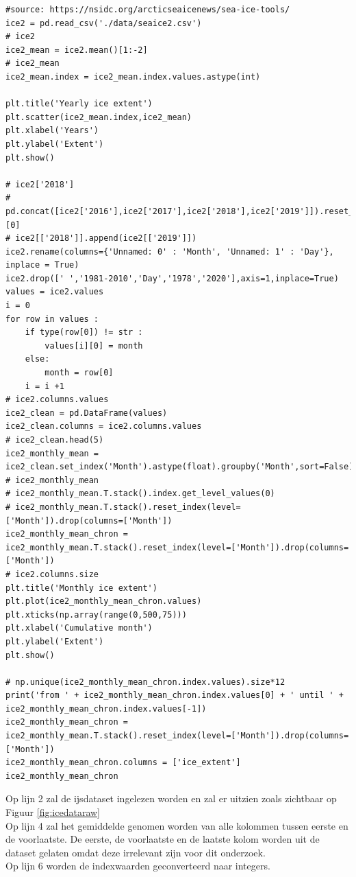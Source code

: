 \label{code:prep_ice}
\begin{verbatim}
#source: https://nsidc.org/arcticseaicenews/sea-ice-tools/
ice2 = pd.read_csv('./data/seaice2.csv')
# ice2
ice2_mean = ice2.mean()[1:-2]
# ice2_mean
ice2_mean.index = ice2_mean.index.values.astype(int)

plt.title('Yearly ice extent')
plt.scatter(ice2_mean.index,ice2_mean)
plt.xlabel('Years')
plt.ylabel('Extent')
plt.show()

# ice2['2018']
# pd.concat([ice2['2016'],ice2['2017'],ice2['2018'],ice2['2019']]).reset_index()[0]
# ice2[['2018']].append(ice2[['2019']])
ice2.rename(columns={'Unnamed: 0' : 'Month', 'Unnamed: 1' : 'Day'}, inplace = True)
ice2.drop([' ','1981-2010','Day','1978','2020'],axis=1,inplace=True)
values = ice2.values
i = 0
for row in values :
    if type(row[0]) != str :
        values[i][0] = month
    else:
        month = row[0]
    i = i +1
# ice2.columns.values
ice2_clean = pd.DataFrame(values)
ice2_clean.columns = ice2.columns.values
# ice2_clean.head(5)
ice2_monthly_mean = ice2_clean.set_index('Month').astype(float).groupby('Month',sort=False).mean()
# ice2_monthly_mean
# ice2_monthly_mean.T.stack().index.get_level_values(0)
# ice2_monthly_mean.T.stack().reset_index(level=['Month']).drop(columns=['Month'])
ice2_monthly_mean_chron = ice2_monthly_mean.T.stack().reset_index(level=['Month']).drop(columns=['Month'])
# ice2.columns.size
plt.title('Monthly ice extent')
plt.plot(ice2_monthly_mean_chron.values)
plt.xticks(np.array(range(0,500,75)))
plt.xlabel('Cumulative month')
plt.ylabel('Extent')
plt.show()

# np.unique(ice2_monthly_mean_chron.index.values).size*12
print('from ' + ice2_monthly_mean_chron.index.values[0] + ' until ' + ice2_monthly_mean_chron.index.values[-1])
ice2_monthly_mean_chron = ice2_monthly_mean.T.stack().reset_index(level=['Month']).drop(columns=['Month'])
ice2_monthly_mean_chron.columns = ['ice_extent']
ice2_monthly_mean_chron
\end{verbatim}

Op lijn 2 zal de ijsdataset ingelezen worden en zal er uitzien zoals zichtbaar op Figuur \ref{fig:icedataraw} \\
Op lijn 4 zal het gemiddelde genomen worden van alle kolommen tussen eerste en de voorlaatste. De eerste, de voorlaatste en de laatste kolom worden uit de dataset gelaten omdat deze irrelevant zijn voor dit onderzoek. \\
Op lijn 6 worden de indexwaarden geconverteerd naar integers. \\

